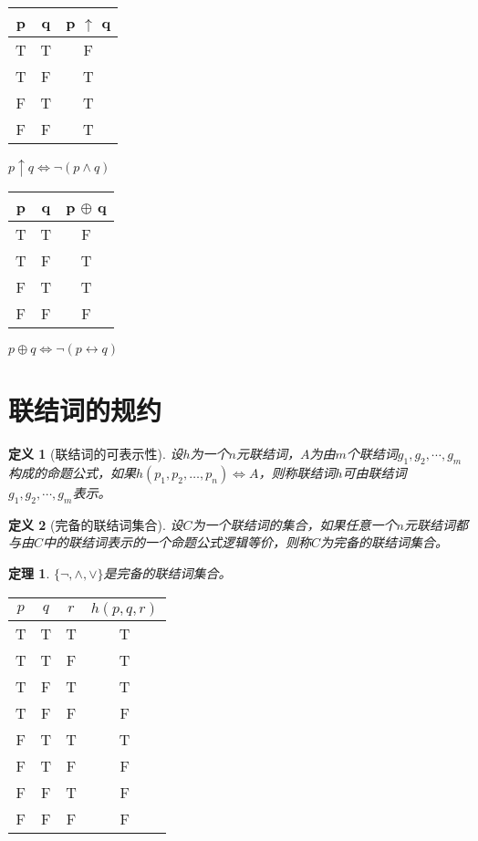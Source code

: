 \documentclass{article}
\newtheorem{Def}{定义}
\newtheorem{Thm}{定理}
\begin{document}
\begin{CJK*}{UTF8}{gbsn}
  \begin{tabular}{cc|c}
    p& q& p $\uparrow$ q\\
    \hline
    T&T&F\\
    T&F&T\\
    F&T&T\\
    F&F&T\\
  \end{tabular}

  $p\uparrow q \Leftrightarrow \lnot (p\land q)$

  \begin{tabular}{cc|c}
    p& q& p $\oplus $ q\\
    \hline
    T&T&F\\
    T&F&T\\
    F&T&T\\
    F&F&F\\
  \end{tabular}

  $p\oplus q \Leftrightarrow \lnot (p\leftrightarrow q)$

  \section{联结词的规约}

  \begin{Def}[联结词的可表示性]
    设$h$为一个$n$元联结词，$A$为由$m$个联结词$g_1,g_2,\cdots, g_m$构成的命题公式，如果$h(p_1,p_2,\ldots,p_n)\Leftrightarrow A$，则称联结词$h$可由联结词$g_1,g_2,\cdots, g_m$表示。
  \end{Def}
  \begin{Def}[完备的联结词集合]
    设$C$为一个联结词的集合，如果任意一个$n$元联结词都与由$C$中的联结词表示的一个命题公式逻辑等价，则称$C$为完备的联结词集合。
  \end{Def}
  \begin{Thm}
    $\{\lnot, \land, \lor\}$是完备的联结词集合。
  \end{Thm}

  \begin{tabular}{ccc|c}
    $p$& $q$& $r$& $h(p,q,r)$\\
    \hline
   T& T&T&T\\
    T&T&F&T\\
    T&F&T&T\\
     T& F&F&F\\
    F&T&T&T\\
    F&T&F&F\\
   F& F&T&F\\
    F&  F&F&F\\      
  \end{tabular}


\end{CJK*}
\end{document}
